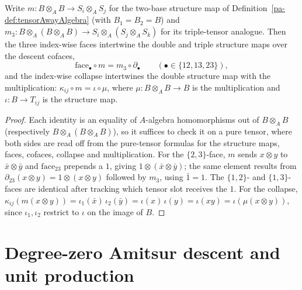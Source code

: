 \begin{lemma}
  \label{pa-lem:faceA_comp_tensorMap}
  \leanok

  Write \(m \colon B \otimes_A B \to S_i \otimes_A S_j\) for the two-base structure map of
  Definition~\ref{pa-def:tensorAwayAlgebra} (with \(B_1 = B_2 = B\)) and \(m_3 \colon
  B \otimes_A (B \otimes_A B) \to S_i \otimes_A (S_j \otimes_A S_k)\) for its triple-tensor
  analogue. Then the three index-wise faces intertwine the double and triple structure maps
  over the descent cofaces,
  \[
    \mathrm{face}_{\bullet} \circ m = m_3 \circ \partial_{\bullet}
    \qquad (\bullet \in \{12, 13, 23\}) ,
  \]
  and the index-wise collapse intertwines the double structure map with the multiplication:
  \(\kappa_{ij} \circ m = \iota \circ \mu\), where \(\mu \colon B \otimes_A B \to B\) is the
  multiplication and \(\iota \colon B \to T_{ij}\) is the structure map.
\end{lemma}
\begin{proof}
  \leanok
  Each identity is an equality of \(A\)-algebra homomorphisms out of \(B \otimes_A B\)
  (respectively \(B \otimes_A (B \otimes_A B)\)), so it suffices to check it on a pure tensor,
  where both sides are read off from the pure-tensor formulas for the structure maps, faces,
  cofaces, collapse and multiplication. For the \(\{2,3\}\)-face, \(m\) sends
  \(x \otimes y\) to \(\bar x \otimes \bar y\) and \(\mathrm{face}_{23}\) prepends a \(1\),
  giving \(1 \otimes (\bar x \otimes \bar y)\); the same element results from
  \(\partial_{23}(x \otimes y) = 1 \otimes (x \otimes y)\) followed by \(m_3\), using
  \(\bar 1 = 1\). The \(\{1,2\}\)- and \(\{1,3\}\)-faces are identical after tracking which
  tensor slot receives the \(1\). For the collapse, \(\kappa_{ij}(m(x \otimes y)) =
  \iota_1(\bar x)\,\iota_2(\bar y) = \iota(x)\,\iota(y) = \iota(xy) = \iota(\mu(x \otimes y))\),
  since \(\iota_1, \iota_2\) restrict to \(\iota\) on the image of \(B\).
\end{proof}

\section{Degree-zero Amitsur descent and unit production}
\label{pa-sec:amitsurDescentAlgebra}

